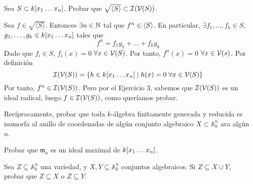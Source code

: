 \documentclass[twoside]{article}
\begin{document}
\newpage 
\begin{ejercicio}{4}
Sea $S\subset k[x_1\dotsc x_{n}]$. Probar que $\sqrt{\langle{S}\rangle}\subset \mathcal{I}(\mathcal{V}(S))$.
\begin{solucion}
Sea $f\in \sqrt{\langle{S}\rangle}$. Entonces $\exists n \in \mathbb{N}$ tal que $f^n \in \langle{S}\rangle$. En particular, $\exists f_1,\dotsc,f_k\in S$, $g_1,\dotsc,g_k \in k[x_1\dotsc x_{n}]$ tales que
$$
f^n = f_1 g_1 + \dotsc + f_k g_k 
$$
Dado que $f_i\in S$, $f_i(x)=0$ $\forall x \in \mathcal{V}(S)$. Por tanto, $f^n(x) = 0$ $\forall x \in \mathcal{V}(s)$. Por definición
$$
\mathcal{I}(\mathcal{V}(S)) =  \{ h \in k[x_1\dotsc x_{n}] \mid h(x)=0 \; \forall x\in \mathcal{V}(S)\}
$$
Por tanto, $f^n \in \mathcal{I}(\mathcal{V}(S))$. Pero por el Ejercicio 3, sabemos que $\mathcal{I}(\mathcal{V}(S))$ es un ideal radical, luego $f\in \mathcal{I}(\mathcal{V}(S))$, como queríamos probar.
\end{solucion}
\end{ejercicio}

\newpage 
\begin{ejercicio}{5}
Recíprocamente, probar que toda $k$-álgebra finitamente generada
y reducida es isomorfa al anillo de coordenadas de algún conjunto algebraico $X \subset \mathbb{A}^n_k$ ara algún $n$.\begin{solucion}
\end{solucion}
\end{ejercicio}

\begin{ejercicio}{6}
Probar que $\mathfrak{m}_a$ es un ideal maximal de $k[x_1\dotsc x_{n}]$.
\end{ejercicio}
\begin{solucion}
\end{solucion}

\begin{ejercicio}{7}
Sea $Z ⊆ \mathbb{A}^n_k$
 una variedad, y $X, Y ⊆ \mathbb{A}^n_k$ conjuntos algebraicos.
Si $Z ⊆ X ∪ Y$, probar que $Z ⊆ X$ o $Z ⊆ Y$.
\end{ejercicio}
\begin{solucion}
\end{solucion}
\end{document}
